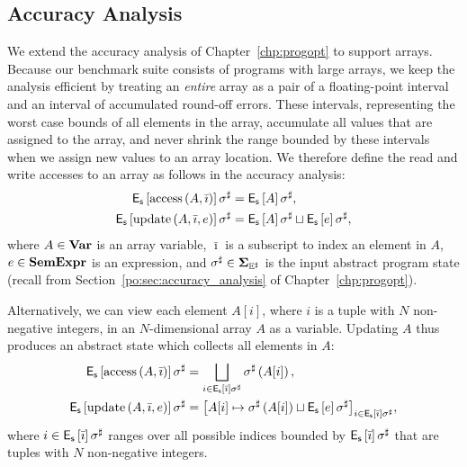 \subsection{Accuracy Analysis}
\label{lo:sub:accuracy}

We extend the accuracy analysis of Chapter~\ref{chp:progopt} to support arrays.
Because our benchmark suite consists of programs with large arrays, we keep
the analysis efficient by treating an \emph{entire} array as a pair of a
floating-point interval and an interval of accumulated round-off errors.
These intervals, representing the worst case bounds of all elements in the
array, accumulate all values that are assigned to the array, and never shrink
the range bounded by these intervals when we assign new values to an array
location.  We therefore define the read and write accesses to an array as
follows in the accuracy analysis:
\begin{equation}
    \begin{aligned}
        \operatorname{\mathsf{E}_\mathsf{s}}\left[{\operatorname{\mathrm{access}}\left({A}, {\bar\imath}\right)}\right]\sigma^\sharp
        &= \operatorname{\mathsf{E}_\mathsf{s}}\left[{A}\right]\sigma^\sharp, \\
        \operatorname{\mathsf{E}_\mathsf{s}}\left[{\operatorname{\mathrm{update}}\left({A}, {\bar\imath}, {e}\right)}\right]\sigma^\sharp
        &= \operatorname{\mathsf{E}_\mathsf{s}}\left[{A}\right]\sigma^\sharp \sqcup
           \operatorname{\mathsf{E}_\mathsf{s}}\left[{e}\right]\sigma^\sharp,
    \end{aligned}
\end{equation}
where $A \in \mathbf{Var}$ is an array variable, $\bar\imath$ is a subscript
to index an element in $A$, $e \in \mathbf{SemExpr}$ is an expression, and
$\sigma^\sharp \in \mathbf{\Sigma}_{\mathbb{E}^\sharp}$ is the input abstract program state (recall from
Section~\ref{po:sec:accuracy_analysis} of Chapter~\ref{chp:progopt}).

Alternatively, we can view each element $A[i]$, where $i$ is a tuple with $N$
non-negative integers, in an $N$-dimensional array $A$ as a variable.  Updating
$A$ thus produces an abstract state which collects all elements in $A$:
\begin{equation}
    \begin{aligned}
        \operatorname{\mathsf{E}_\mathsf{s}}\left[{\operatorname{\mathrm{access}}\left({A}, {\bar\imath}\right)}\right]\sigma^\sharp
        &= \bigsqcup_{i \in \operatorname{\mathsf{E}_\mathsf{s}}\left[{\bar\imath}\right]\sigma^\sharp}
            \sigma^\sharp \left( A[i] \right), \\
        \operatorname{\mathsf{E}_\mathsf{s}}\left[{\operatorname{\mathrm{update}}\left({A}, {\bar\imath}, {e}\right)}\right]\sigma^\sharp
        &= {\left[
            A[i] \mapsto \sigma^\sharp \left( A[i] \right) \sqcup
                \operatorname{\mathsf{E}_\mathsf{s}}\left[{e}\right]\sigma^\sharp
        \right]}_{i \in \operatorname{\mathsf{E}_\mathsf{s}}\left[{\bar\imath}\right]\sigma^\sharp},
    \end{aligned}
\end{equation}
where $i \in \operatorname{\mathsf{E}_\mathsf{s}}\left[{\bar\imath}\right]\sigma^\sharp$ ranges over all possible
indices bounded by $\operatorname{\mathsf{E}_\mathsf{s}}\left[{\bar\imath}\right]\sigma^\sharp$ that are tuples
with $N$ non-negative integers.

